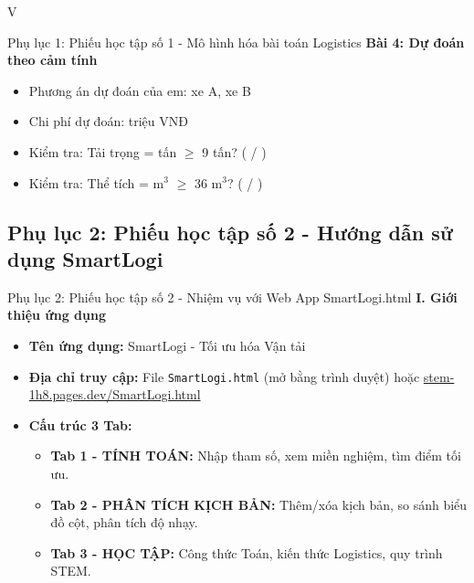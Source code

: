 \documentclass[12pt,a4paper]{article}
\begin{document}
\begin{competitionsection}{V}
\begin{phieuhoc_tap_box}{Phụ lục 1: Phiếu học tập số 1 - Mô hình hóa bài toán Logistics}
\textbf{Bài 4: Dự đoán theo cảm tính}
\begin{itemize}[leftmargin=*,noitemsep]
\item Phương án dự đoán của em: \underline{\hspace{2cm}} xe A, \underline{\hspace{2cm}} xe B
\item Chi phí dự đoán: \underline{\hspace{3cm}} triệu VNĐ
\item Kiểm tra: Tải trọng = \underline{\hspace{2cm}} tấn $\ge$ 9 tấn? \quad ( / )
\item Kiểm tra: Thể tích = \underline{\hspace{2cm}} m$^3$ $\ge$ 36 m$^3$? \quad ( / )
\end{itemize}
\end{phieuhoc_tap_box}

\newpage
\subsection*{Phụ lục 2: Phiếu học tập số 2 - Hướng dẫn sử dụng SmartLogi}
\begin{phieuhoc_tap_box}{Phụ lục 2: Phiếu học tập số 2 - Nhiệm vụ với Web App SmartLogi.html}
\textbf{\color{accent}I. Giới thiệu ứng dụng}
\begin{itemize}[leftmargin=*,noitemsep]
\item \textbf{Tên ứng dụng:} SmartLogi - Tối ưu hóa Vận tải
\item \textbf{Địa chỉ truy cập:} File \texttt{SmartLogi.html} (mở bằng trình duyệt) hoặc \href{https://stem-1h8.pages.dev/SmartLogi.html}{stem-1h8.pages.dev/SmartLogi.html}
\item \textbf{Cấu trúc 3 Tab:}
    \begin{itemize}
    \item \textbf{Tab 1 - TÍNH TOÁN:} Nhập tham số, xem miền nghiệm, tìm điểm tối ưu.
    \item \textbf{Tab 2 - PHÂN TÍCH KỊCH BẢN:} Thêm/xóa kịch bản, so sánh biểu đồ cột, phân tích độ nhạy.
    \item \textbf{Tab 3 - HỌC TẬP:} Công thức Toán, kiến thức Logistics, quy trình STEM.
    \end{itemize}
\end{itemize}


\end{phieuhoc_tap_box}
\end{competitionsection}
\end{document}
